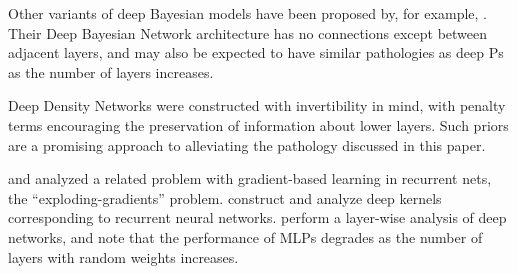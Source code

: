 \documentclass[twoside]{article}
\makeatletter
\newlength{\nonHumbleHeight}
\def\@humbleformat#1{{\settoheight{\nonHumbleHeight}{#1}\resizebox{!}{0.94\nonHumbleHeight}{#1}}}%
\def\humble#1{\@humbleformat{#1}}%
\newcommand{\gp}{{\humble GP}}
\makeatother
\begin{document}
Other variants of deep Bayesian models have been proposed by, for example, \citet{adams2010learning}. %
Their Deep Bayesian Network architecture has no connections except between adjacent layers, and may also be expected to have similar pathologies as deep \gp{}s as the number of layers increases.

Deep Density Networks \citep{rippel2013high} were constructed with invertibility in mind, with penalty terms encouraging the preservation of information about lower layers. Such priors are a promising approach to alleviating the pathology discussed in this paper.
%
%


%
\cite{bengio1994learning} and \cite{pascanu2012understanding} analyzed a related problem with gradient-based learning in recurrent nets, the ``exploding-gradients'' problem.
%
\cite{hermans2012recurrent} construct and analyze deep kernels corresponding to recurrent neural networks.
%
%
%
\cite{montavon2010layer} perform a layer-wise analysis of deep networks, and note that the performance of MLPs degrades as the number of layers with random weights increases.





\end{document}
